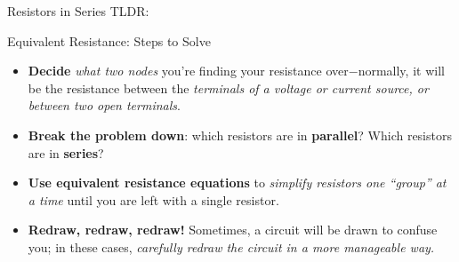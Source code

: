 \begin{frame}{Resistors in Series}
    \LARGE{
        TLDR: \\[1ex]
    }
\end{frame}

\begin{frame}{Equivalent Resistance: Steps to Solve}
    \begin{itemize}
        \item \textbf{Decide} \textit{what two nodes} you’re finding your resistance over$-$normally, it will be the resistance between the \textit{terminals of a voltage or current source, or between two open terminals}. \\[1ex]
        \item \textbf{Break the problem down}: which resistors are in \textbf{parallel}? Which resistors are in \textbf{series}? \\[1ex]
        \item \textbf{Use equivalent resistance equations} to \textit{simplify resistors one “group” at a time} until you are left with a single resistor. \\[1ex]
        \item \textbf{Redraw, redraw, redraw!} Sometimes, a circuit will be drawn to confuse you; in these cases, \textit{carefully redraw the circuit in a more manageable way.}
    \end{itemize}
\end{frame}


